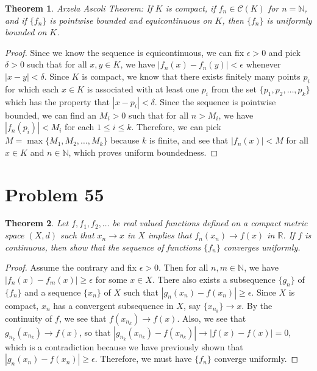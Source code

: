 \documentclass[psamsfonts]{amsart}
\newtheorem{thm}{Theorem}[section]
\theoremstyle{definition}
\theoremstyle{remark}
\numberwithin{equation}{section}
\begin{document}
\begin{thm}
Arzela Ascoli Theorem: If $K$ is compact, if $f_n \in \mathscr{C}(K)$ for $n=\mathbb{N}$, and if $\{ f_n \}$ is pointwise bounded and equicontinuous on $K$, then $\{f_n \}$ is uniformly bounded on $K$.
\end{thm}

\begin{proof}
Since we know the sequence is equicontinuous, we can fix $\epsilon > 0$ and pick $\delta > 0$ such that for all $x,y \in K$, we have $|f_n(x) - f_n(y)| < \epsilon$ whenever $|x-y| < \delta$. Since $K$ is compact, we know that there exists finitely many points $p_i$ for which each $x \in K$ is associated with at least one $p_i$ from the set $\{p_1, p_2, \ldots, p_k \}$ which has the property that $|x - p_i| < \delta$. Since the sequence is pointwise bounded, we can find an $M_i > 0$ such that for all $n >M_i$, we have $|f_n(p_i)| < M_i$ for each $1 \leq i \leq k$. Therefore, we can pick $M = \max\{ M_1, M_2, \ldots, M_k \}$ because $k$ is finite, and see that $|f_n(x)| < M$ for all $x \in K$ and $n \in \mathbb{N}$, which proves uniform boundedness.
\end{proof}

\section{Problem 55}

\begin{thm}
Let $f, f_1, f_2, \ldots $ be real valued functions defined on a compact metric space $(X,d)$ such that $x_n \to x$ in $X$ implies that $f_n(x_n) \to f(x)$ in $\mathbb{R}$. If $f$ is continuous, then show that the sequence of functions $\{ f_n \}$ converges uniformly.
\end{thm}

\begin{proof}
Assume the contrary and fix $\epsilon > 0$. Then for all $n,m \in \mathbb{N}$, we have $|f_n(x) - f_m(x)| \geq \epsilon$ for some $x \in X$. There also exists a subsequence $\{ g_n \}$ of $\{ f_n \}$ and a sequence $\{ x_n \}$ of $X$ such that $|g_n (x_n) - f(x_n) | \geq \epsilon$. Since $X$ is compact, $x_n$ has a convergent subsequence in $X$, say $\{ x_{n_k}\} \to x$. By the continuity of $f$, we see that $f(x_{n_k}) \to f(x)$. Also, we see that $g_{n_k} ( x_{n_k}) \to f(x)$, so that $|g_{n_k} (x_{n_k}) - f( x_{n_k}) | \to |f(x) - f(x)| = 0$, which is a contradiction because we have previously shown that $|g_n(x_n) - f(x_n)| \geq \epsilon$. Therefore, we must have $\{ f_n \}$ converge uniformly.
\end{proof}
\end{document}
